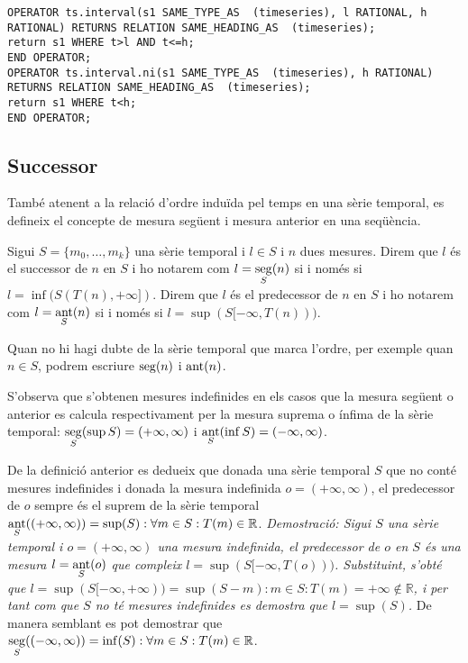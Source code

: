 \begin{verbatim}
OPERATOR ts.interval(s1 SAME_TYPE_AS  (timeseries), l RATIONAL, h RATIONAL) RETURNS RELATION SAME_HEADING_AS  (timeseries);
return s1 WHERE t>l AND t<=h;
END OPERATOR;
OPERATOR ts.interval.ni(s1 SAME_TYPE_AS  (timeseries), h RATIONAL) RETURNS RELATION SAME_HEADING_AS  (timeseries);
return s1 WHERE t<h;
END OPERATOR;
\end{verbatim}



\subsection{Successor}


També atenent a la relació d'ordre induïda pel temps en una sèrie temporal, es
defineix el concepte de mesura següent i mesura anterior en una
seqüència.

\begin{definition}
  Sigui $S=\{m_0, \ldots, m_k\}$ una sèrie temporal i $l\in S$ i $n$ dues
  mesures. Direm que $l$ és el successor de $n$ en $S$ i ho notarem
  com $l=\operatorname*{seg}\limits_S(n)$ si i només si $l=\inf(S(T(n),+\infty])$.
  Direm que $l$ és el predecessor de $n$ en $S$ i ho notarem com
  $l=\operatorname*{ant}\limits_S(n)$ si i només si $l=\sup(S[-\infty,T(n)))$.

Quan no hi hagi dubte de la sèrie temporal que marca l'ordre, per
exemple quan $n\in S$, podrem escriure $\operatorname*{seg}(n)$ i $\operatorname*{ant}(n)$.
\end{definition}
S'observa que s'obtenen mesures indefinides en els casos que la
mesura següent o anterior es calcula respectivament per la mesura
suprema o ínfima de la sèrie temporal: $\operatorname*{seg}\limits_S(\sup
S)=(+\infty,\infty)$ i $\operatorname*{ant}\limits_S(\inf S)=(-\infty,\infty)$.

De la definició anterior es dedueix que donada una sèrie temporal $S$
que no conté mesures indefinides i donada la mesura indefinida
$o=(+\infty,\infty)$, el predecessor de $o$ sempre és el suprem de la
sèrie temporal $\operatorname*{ant}\limits_S( (+\infty,\infty) ) = \sup(S): \forall
m\in S: T(m)\in\mathbb{R}$.  %
\emph{Demostració: Sigui $S$ una sèrie temporal i $o=(+\infty,\infty)$
  una mesura indefinida, el predecessor de $o$ en $S$ és una mesura
  $l=\operatorname*{ant}\limits_S(o)$ que compleix
  $l=\sup(S[-\infty,T(o)))$. Substituint, s'obté que
  $l=\sup(S[-\infty,+\infty))=\sup(S-m):m\in S:T(m)=+\infty \notin
  \mathbb{R}$, i per tant com que $S$ no té mesures indefinides es
  demostra que $l=\sup(S)$.  } De manera semblant es pot demostrar que
$\operatorname*{seg}\limits_S( (-\infty,\infty) ) = \inf(S): \forall m\in S:
T(m)\in\mathbb{R}$.





